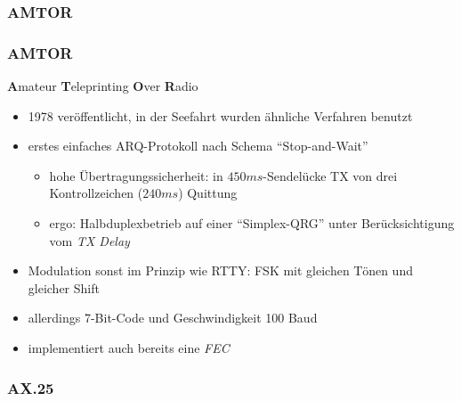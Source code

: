 \subsubsection{AMTOR}

\begin{frame}
    \frametitle{AMTOR}

    \textbf{A}mateur \textbf{T}eleprinting \textbf{O}ver \textbf{R}adio

    \begin{itemize}
        \item 1978 veröffentlicht, in der Seefahrt wurden ähnliche Verfahren benutzt
        \item erstes einfaches ARQ-Protokoll nach Schema ``Stop-and-Wait''
        \begin{itemize}
            \item hohe Übertragungssicherheit: in $450ms$-Sendelücke TX von drei
                  Kontrollzeichen ($240ms$) Quittung
            \item ergo: Halbduplexbetrieb auf einer ``Simplex-QRG'' unter
                  Berücksichtigung vom \emph{TX Delay}
        \end{itemize}
        \item Modulation sonst im Prinzip wie RTTY: FSK mit gleichen Tönen und gleicher Shift
        \item allerdings 7-Bit-Code und Geschwindigkeit 100 Baud
        \item implementiert auch bereits eine \emph{FEC}
    \end{itemize}

\end{frame}

\subsubsection{AX.25}

